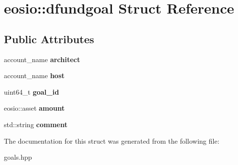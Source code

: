 \hypertarget{structeosio_1_1dfundgoal}{}\section{eosio\+:\+:dfundgoal Struct Reference}
\label{structeosio_1_1dfundgoal}
\subsection*{Public Attributes}
\begin{DoxyCompactItemize}
\item 
\mbox{\label{structeosio_1_1dfundgoal_a9b01895e96efbd4da4b58407476df3c2}} 
account\+\_\+name {\bfseries architect}
\item 
\mbox{\label{structeosio_1_1dfundgoal_aded2cefb08af2f72f688d000b065fd42}} 
account\+\_\+name {\bfseries host}
\item 
\mbox{\label{structeosio_1_1dfundgoal_a33757dac905ac813783a397296052da9}} 
uint64\+\_\+t {\bfseries goal\+\_\+id}
\item 
\mbox{\label{structeosio_1_1dfundgoal_a51781895c53cc5b97049520af6e31202}} 
eosio\+::asset {\bfseries amount}
\item 
\mbox{\label{structeosio_1_1dfundgoal_ae17b353071705117aa9ac744ed1ec9dc}} 
std\+::string {\bfseries comment}
\end{DoxyCompactItemize}


The documentation for this struct was generated from the following file\+:\begin{DoxyCompactItemize}
\item 
goals.\+hpp\end{DoxyCompactItemize}
